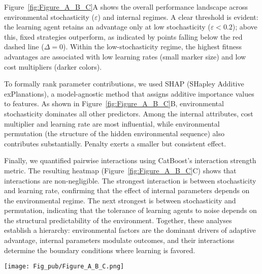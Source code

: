 \documentclass[aps,pre,twocolumn,floatfix,nofootinbib,amsmath,amssymb]{revtex4-2}
\begin{document}
Figure~\ref{fig:Figure_A_B_C}A shows the overall performance landscape across environmental stochasticity (\(\varepsilon\)) and internal regimes. A clear threshold is evident: the learning agent retains an advantage only at low stochasticity (\(\varepsilon < 0.2\)); above this, fixed strategies outperform, as indicated by points falling below the red dashed line (\(\Delta = 0\)). Within the low-stochasticity regime, the highest fitness advantages are associated with low learning rates (small marker size) and low cost multipliers (darker colors).  

To formally rank parameter contributions, we used SHAP (SHapley Additive exPlanations), a model-agnostic method that assigns additive importance values to features. As shown in Figure~\ref{fig:Figure_A_B_C}B, environmental stochasticity dominates all other predictors. Among the internal attributes, cost multiplier and learning rate are most influential, while environmental permutation (the structure of the hidden environmental sequence) also contributes substantially. Penalty exerts a smaller but consistent effect.  

Finally, we quantified pairwise interactions using CatBoost's interaction strength metric. The resulting heatmap (Figure~\ref{fig:Figure_A_B_C}C) shows that interactions are non-negligible. The strongest interaction is between stochasticity and learning rate, confirming that the effect of internal parameters depends on the environmental regime. The next strongest is between stochasticity and permutation, indicating that the tolerance of learning agents to noise depends on the structural predictability of the environment. Together, these analyses establish a hierarchy: environmental factors are the dominant drivers of adaptive advantage, internal parameters modulate outcomes, and their interactions determine the boundary conditions where learning is favored.

\begin{figure*}[t]
    \centering
    \texttt{[image: Fig\_pub/Figure\_A\_B\_C.png]}
    \caption{\textbf{Drivers of Adaptive Advantage.} 
    \textbf{A)} Performance landscape of the learning agent across environmental stochasticity (\(\varepsilon\)), cost multiplier (color), and learning rate (marker size). The red dashed line marks \(\Delta = 0\), the point where fixed strategies outperform. 
    \textbf{B)} Mean absolute SHAP (SHapley Additive exPlanations) values ranking the contribution of each parameter to the model's predictions. 
    \textbf{C)} Heatmap of pairwise interaction strengths, showing dependencies between environmental and internal parameters.}
    \label{fig:Figure_A_B_C}
\end{figure*}
\end{document}
